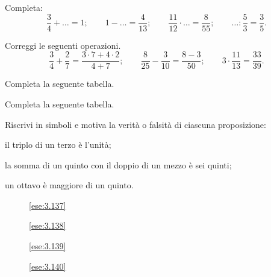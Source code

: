 \begin{esercizio}
Completa:
\[\frac{3}{4}+\ldots=1;\qquad1-\ldots=\frac{4}{13};\qquad\frac{11}{12}\cdot\ldots=\frac{8}{55};%
\qquad\ldots:\frac{5}{3}=\frac{3}{5}.\]
\end{esercizio}

\begin{esercizio}
Correggi le seguenti operazioni.
\[\frac{3}{4}+\frac{2}{7}=\frac{3\cdot7+4\cdot2}{4+7};\qquad%
\frac{8}{25}-\frac{3}{10}=\frac{8-3}{50};\qquad%
3\cdot\frac{11}{13}=\frac{33}{39}.\]
\end{esercizio}

\begin{esercizio}
Completa la seguente tabella.
\begin{center}
 
\end{center}
\end{esercizio}

\begin{esercizio}
 Completa la seguente tabella.
\begin{center}
 
\end{center}
\end{esercizio}


\begin{esercizio}
Riscrivi in simboli e motiva la verità o falsità di ciascuna proposizione:
\begin{enumeratea}
\item il triplo di un terzo è l'unità;
\item la somma di un quinto con il doppio di un mezzo è sei quinti;
\item un ottavo è maggiore di un quinto.
\end{enumeratea}
\end{esercizio}

\begin{figure}[t]
 \begin{minipage}[b]{.20\textwidth}
 \centering
 \caption{\ref{ese:3.137}}\label{fig:3.6}
 \end{minipage}\hfil
 \begin{minipage}[b]{.20\textwidth}
 \centering 
 \caption{\ref{ese:3.138}}\label{fig:3.7}
 \end{minipage}\hfil
 \begin{minipage}[b]{.20\textwidth}
 \centering
 \caption{\ref{ese:3.139}}\label{fig:3.8}
 \end{minipage}\hfil
 \begin{minipage}[b]{.23\textwidth}
 \centering
 \caption{\ref{ese:3.140}}\label{fig:3.9}
 \end{minipage}\hfil
\end{figure}


